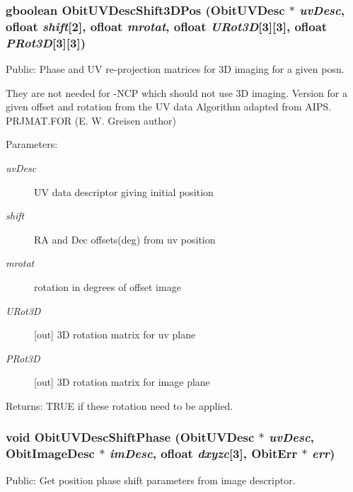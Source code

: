 \subsubsection{\setlength{\rightskip}{0pt plus 5cm}gboolean Obit\-UVDesc\-Shift3DPos ({\bf Obit\-UVDesc} $\ast$ {\em uv\-Desc}, {\bf ofloat} {\em shift}[2], {\bf ofloat} {\em mrotat}, {\bf ofloat} {\em URot3D}[3][3], {\bf ofloat} {\em PRot3D}[3][3])}\label{ObitUVDesc_8h_a22}


Public: Phase and UV re-projection matrices for 3D imaging for a given posn. 

They are not needed for -NCP which should not use 3D imaging. Version for a given offset and rotation from the UV data Algorithm adapted from AIPS. PRJMAT.FOR (E. W. Greisen author) \begin{Desc}
\item[Parameters:]
\begin{description}
\item[{\em uv\-Desc}]UV data descriptor giving initial position \item[{\em shift}]RA and Dec offsets(deg) from uv position \item[{\em mrotat}]rotation in degrees of offset image \item[{\em URot3D}][out] 3D rotation matrix for uv plane \item[{\em PRot3D}][out] 3D rotation matrix for image plane \end{description}
\end{Desc}
\begin{Desc}
\item[Returns:]TRUE if these rotation need to be applied. \end{Desc}
\subsubsection{\setlength{\rightskip}{0pt plus 5cm}void Obit\-UVDesc\-Shift\-Phase ({\bf Obit\-UVDesc} $\ast$ {\em uv\-Desc}, {\bf Obit\-Image\-Desc} $\ast$ {\em im\-Desc}, {\bf ofloat} {\em dxyzc}[3], {\bf Obit\-Err} $\ast$ {\em err})}\label{ObitUVDesc_8h_a18}


Public: Get position phase shift parameters from image descriptor. 

